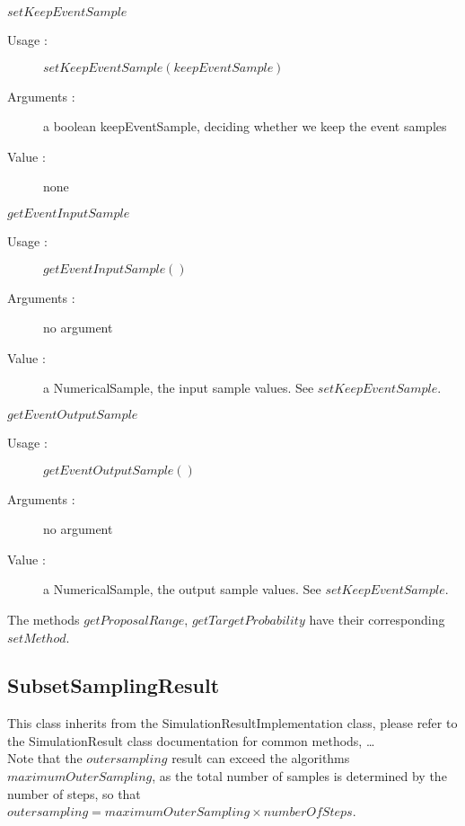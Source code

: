 \begin{description}
  \item $setKeepEventSample$
    \begin{description}
    \item[Usage :] $setKeepEventSample(keepEventSample)$
    \item[Arguments :] a boolean keepEventSample, deciding whether we keep the event samples
    \item[Value :] none
    \end{description}
    \bigskip   
    
  \item $getEventInputSample$
    \begin{description}
    \item[Usage :] $getEventInputSample()$
    \item[Arguments :] no argument
    \item[Value :] a NumericalSample, the input sample values. See $setKeepEventSample$.
    \end{description}
    \bigskip 
    
  \item $getEventOutputSample$
    \begin{description}
    \item[Usage :] $getEventOutputSample()$
    \item[Arguments :] no argument
    \item[Value :] a NumericalSample, the output sample values. See $setKeepEventSample$.
    \end{description}
    \bigskip 
    
The methods $getProposalRange$, $getTargetProbability$ have their corresponding $setMethod$.

\item[Links] \rule{0pt}{1em}
\end{description}


\newpage \subsection{SubsetSamplingResult}

This class inherits from the SimulationResultImplementation class, please refer to the SimulationResult class documentation for common methods, \dots \\
Note that the $outersampling$ result can exceed the algorithms $maximumOuterSampling$, as the total number of samples is determined by the number of steps, so that 
$outersampling = maximumOuterSampling \times numberOfSteps$.\\

